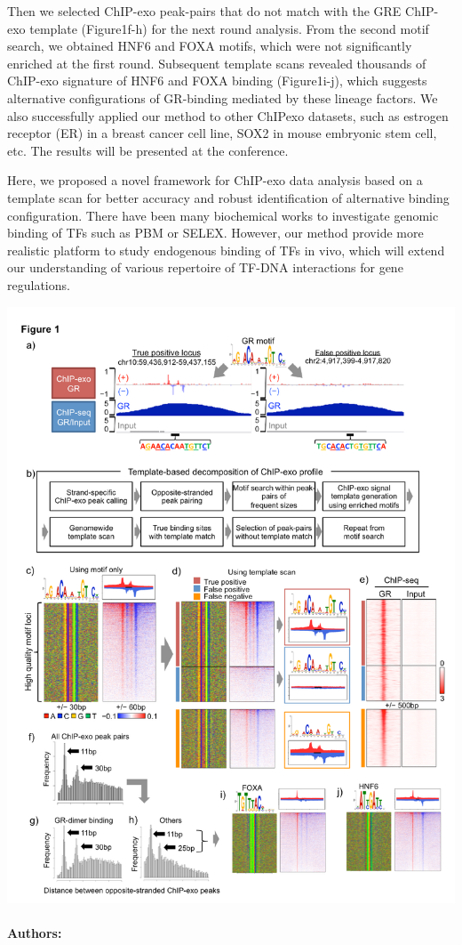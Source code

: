 Then we selected ChIP-exo peak-pairs that do not match
with the GRE ChIP-exo template (Figure1f-h) for the
next round analysis. From the second motif search, we
obtained HNF6 and FOXA motifs, which were not significantly enriched at the first round. Subsequent template
scans revealed thousands of ChIP-exo signature of HNF6
and FOXA binding (Figure1i-j), which suggests alternative configurations of GR-binding mediated by these lineage factors.
We also successfully applied our method to other ChIPexo datasets, such as estrogen receptor (ER) in a breast
cancer cell line, SOX2 in mouse embryonic stem cell, etc.
The results will be presented at the conference.


Here, we proposed a novel framework for ChIP-exo data
analysis based on a template scan for better accuracy and
robust identification of alternative binding configuration.
There have been many biochemical works to investigate
genomic binding of TFs such as PBM or SELEX. However, our method provide more realistic platform to study
endogenous binding of TFs in vivo, which will extend our
understanding of various repertoire of TF-DNA interactions for gene regulations.

\includegraphics{17.pdf}

\noindent \paragraph{Authors:} 

